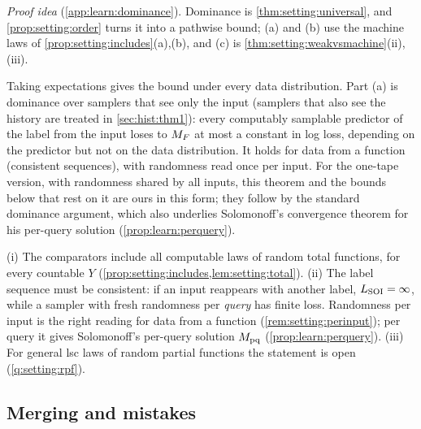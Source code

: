\emph{Proof idea} (\cref{app:learn:dominance}). Dominance is \cref{thm:setting:universal}, and \cref{prop:setting:order} turns it into a pathwise bound; (a) and (b) use the machine laws of \cref{prop:setting:includes}(a),(b), and (c) is \cref{thm:setting:weakvsmachine}(ii),(iii).

Taking expectations gives the bound under every data distribution. Part (a) is dominance over samplers that see only the input (samplers that also see the history are treated in \cref{sec:hist:thm1}): every computably samplable predictor of the label from the input loses to $M_{F}$ at most a constant in log loss, depending on the predictor but not on the data distribution. It holds for data from a function (consistent sequences), with randomness read once per input. For the one-tape version, with randomness shared by all inputs, this theorem and the bounds below that rest on it are ours in this form; they follow by the standard dominance argument, which also underlies Solomonoff's convergence theorem for his per-query solution (\cref{prop:learn:perquery}).

\begin{remark}\label{rem:learn:h2}
(i) The comparators include all computable laws of random total functions, for every countable $Y$ (\cref{prop:setting:includes,lem:setting:total}).
(ii) The label sequence must be consistent: if an input reappears with another label, $L_{\mathrm{SOI}}=\infty$, while a sampler with fresh randomness per \emph{query} has finite loss. Randomness per input is the right reading for data from a function (\cref{rem:setting:perinput}); per query it gives Solomonoff's per-query solution $M_{\mathrm{pq}}$ (\cref{prop:learn:perquery}).
(iii) For general lsc laws of random partial functions the statement is open (\cref{q:setting:rpf}).
\end{remark}

\subsection{Merging and mistakes}\label{sec:learn:merging}

